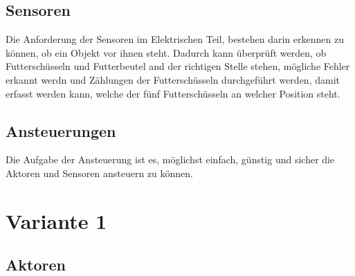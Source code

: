 \subsection{Sensoren}
Die Anforderung der Sensoren im Elektrischen Teil, bestehen darin erkennen zu können, ob ein Objekt vor ihnen steht. Dadurch kann überprüft werden, ob Futterschüsseln und Futterbeutel and der richtigen Stelle stehen, mögliche Fehler erkannt werdn und Zählungen der Futterschüsseln durchgeführt werden, damit erfasst werden kann, welche der fünf Futterschüsseln an welcher Position steht.
\subsection{Ansteuerungen}
Die Aufgabe der Ansteuerung ist es, möglichst einfach, günstig und sicher die Aktoren und Sensoren ansteuern zu können.

\section{Variante 1}
\subsection{Aktoren}
